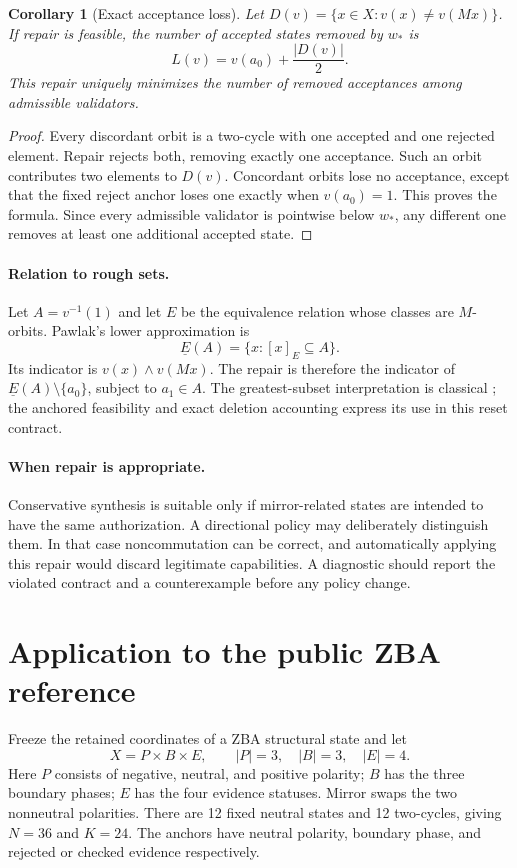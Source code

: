 \documentclass[11pt,a4paper]{article}
\newtheorem{corollary}[theorem]{Corollary}
\begin{document}
\begin{corollary}[Exact acceptance loss]\label{cor:loss}
Let $D(v)=\{x\in X:v(x)\ne v(Mx)\}$. If repair is feasible, the number of accepted states removed by $w_*$ is
\[
 L(v)=v(a_0)+\frac{|D(v)|}{2}.
\]
This repair uniquely minimizes the number of removed acceptances among admissible validators.
\end{corollary}
\begin{proof}
Every discordant orbit is a two-cycle with one accepted and one rejected element. Repair rejects both, removing exactly one acceptance. Such an orbit contributes two elements to $D(v)$. Concordant orbits lose no acceptance, except that the fixed reject anchor loses one exactly when $v(a_0)=1$. This proves the formula. Since every admissible validator is pointwise below $w_*$, any different one removes at least one additional accepted state.
\end{proof}

\paragraph{Relation to rough sets.}
Let $A=v^{-1}(1)$ and let $E$ be the equivalence relation whose classes are $M$-orbits. Pawlak's lower approximation is
\[
 \underline{E}(A)=\{x:[x]_E\subseteq A\}.
\]
Its indicator is $v(x)\wedge v(Mx)$. The repair is therefore the indicator of $\underline{E}(A)\setminus\{a_0\}$, subject to $a_1\in A$. The greatest-subset interpretation is classical \cite{pawlak,yao}; the anchored feasibility and exact deletion accounting express its use in this reset contract.

\paragraph{When repair is appropriate.}
Conservative synthesis is suitable only if mirror-related states are intended to have the same authorization. A directional policy may deliberately distinguish them. In that case noncommutation can be correct, and automatically applying this repair would discard legitimate capabilities. A diagnostic should report the violated contract and a counterexample before any policy change.

\section{Application to the public ZBA reference}
Freeze the retained coordinates of a ZBA structural state and let
\[
 X=P\times B\times E,\qquad |P|=3,\quad |B|=3,\quad |E|=4.
\]
Here $P$ consists of negative, neutral, and positive polarity; $B$ has the three boundary phases; $E$ has the four evidence statuses. Mirror swaps the two nonneutral polarities. There are 12 fixed neutral states and 12 two-cycles, giving $N=36$ and $K=24$. The anchors have neutral polarity, boundary phase, and rejected or checked evidence respectively.
\end{document}
